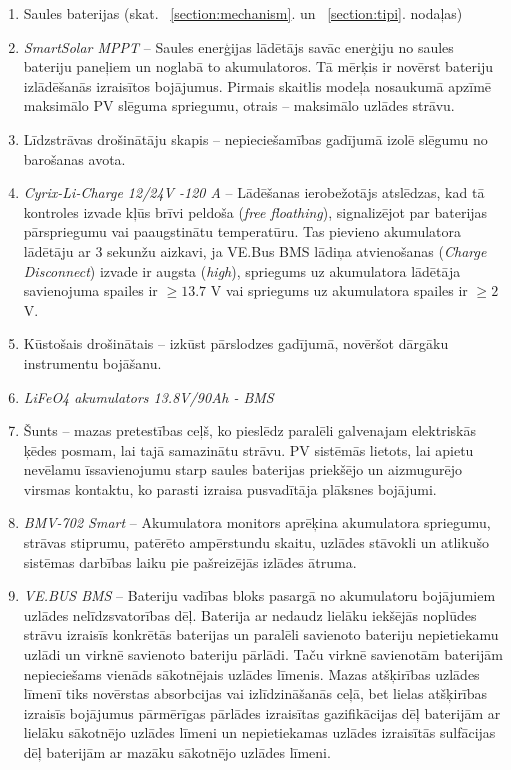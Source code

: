 \begin{enumerate}
\item Saules baterijas (skat. ~\ref{section:mechanism}. un ~\ref{section:tipi}. nodaļas)
\item \emph{SmartSolar MPPT} --
Saules enerģijas lādētājs savāc enerģiju no saules bateriju paneļiem un noglabā to akumulatoros. Tā mērķis ir novērst bateriju izlādēšanās izraisītos bojājumus. Pirmais skaitlis modeļa nosaukumā apzīmē maksimālo PV slēguma spriegumu, otrais -- maksimālo uzlādes strāvu.
\item Līdzstrāvas drošinātāju skapis -- nepieciešamības gadījumā izolē slēgumu no barošanas avota.
\item \emph{Cyrix-Li-Charge 12/24V -120 A} --
Lādēšanas ierobežotājs atslēdzas, kad tā kontroles izvade kļūs brīvi peldoša (\textit{free floathing}), signalizējot par baterijas pārspriegumu vai paaugstinātu temperatūru. Tas pievieno akumulatora lādētāju ar 3 sekunžu aizkavi, ja VE.Bus BMS lādiņa atvienošanas (\textit{Charge Disconnect}) izvade ir augsta (\textit{high}), spriegums uz akumulatora lādētāja savienojuma spailes ir $\geq 13.7$ V vai spriegums uz akumulatora spailes ir $\geq 2$V.
\item Kūstošais drošinātais --
izkūst pārslodzes gadījumā, novēršot dārgāku instrumentu bojāšanu.
\item \emph{LiFeO4 akumulators 13.8V/90Ah - BMS}
\item Šunts -- mazas pretestības ceļš, ko pieslēdz paralēli galvenajam elektriskās ķēdes posmam, lai tajā samazinātu strāvu. PV sistēmās lietots, lai apietu nevēlamu īssavienojumu starp saules baterijas priekšējo un aizmugurējo virsmas kontaktu, ko parasti izraisa pusvadītāja plāksnes bojājumi.
\item \emph{BMV-702 Smart} --
Akumulatora monitors aprēķina akumulatora spriegumu, strāvas stiprumu, patērēto ampērstundu skaitu, uzlādes stāvokli un atlikušo sistēmas darbības laiku pie pašreizējās izlādes ātruma.
\item \emph{VE.BUS BMS} --
Bateriju vadības bloks pasargā no akumulatoru bojājumiem uzlādes nelīdzsvatorības dēļ. Baterija ar nedaudz lielāku iekšējās noplūdes strāvu
izraisīs konkrētās baterijas un paralēli savienoto bateriju nepietiekamu uzlādi un virknē savienoto bateriju pārlādi. Taču virknē savienotām baterijām nepieciešams vienāds sākotnējais uzlādes līmenis. Mazas atšķirības uzlādes līmenī tiks novērstas absorbcijas vai izlīdzināšanās ceļā, bet lielas atšķirības izraisīs bojājumus pārmērīgas pārlādes izraisītas gazifikācijas dēļ baterijām ar lielāku sākotnējo uzlādes līmeni un nepietiekamas uzlādes izraisītās sulfācijas dēļ baterijām ar mazāku sākotnējo uzlādes līmeni.


\end{enumerate}
